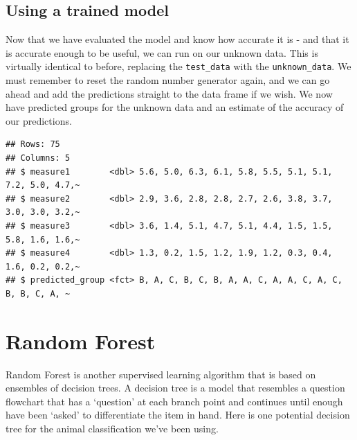 \documentclass[
]{book}
\newenvironment{Shaded}{\begin{snugshade}}{\end{snugshade}}
\newcommand{\DataTypeTok}[1]{\textcolor[rgb]{0.13,0.29,0.53}{#1}}
\newcommand{\DecValTok}[1]{\textcolor[rgb]{0.00,0.00,0.81}{#1}}
\newcommand{\KeywordTok}[1]{\textcolor[rgb]{0.13,0.29,0.53}{\textbf{#1}}}
\newcommand{\NormalTok}[1]{#1}
\newcommand{\OperatorTok}[1]{\textcolor[rgb]{0.81,0.36,0.00}{\textbf{#1}}}
\newcommand{\StringTok}[1]{\textcolor[rgb]{0.31,0.60,0.02}{#1}}
\begin{document}
\hypertarget{using-a-trained-model}{%
\subsection{Using a trained model}\label{using-a-trained-model}}

Now that we have evaluated the model and know how accurate it is - and that it is accurate enough to be useful, we can run on our unknown data. This is virtually identical to before, replacing the \texttt{test\_data} with the \texttt{unknown\_data}. We must remember to reset the random number generator again, and we can go ahead and add the predictions straight to the data frame if we wish. We now have predicted groups for the unknown data and an estimate of the accuracy of our predictions.

\begin{Shaded}
\end{Shaded}

\begin{verbatim}
## Rows: 75
## Columns: 5
## $ measure1        <dbl> 5.6, 5.0, 6.3, 6.1, 5.8, 5.5, 5.1, 5.1, 7.2, 5.0, 4.7,~
## $ measure2        <dbl> 2.9, 3.6, 2.8, 2.8, 2.7, 2.6, 3.8, 3.7, 3.0, 3.0, 3.2,~
## $ measure3        <dbl> 3.6, 1.4, 5.1, 4.7, 5.1, 4.4, 1.5, 1.5, 5.8, 1.6, 1.6,~
## $ measure4        <dbl> 1.3, 0.2, 1.5, 1.2, 1.9, 1.2, 0.3, 0.4, 1.6, 0.2, 0.2,~
## $ predicted_group <fct> B, A, C, B, C, B, A, A, C, A, A, C, A, C, B, B, C, A, ~
\end{verbatim}

\hypertarget{random-forest}{%
\section{Random Forest}\label{random-forest}}

Random Forest is another supervised learning algorithm that is based on ensembles of decision trees. A decision tree is a model that resembles a question flowchart that has a `question' at each branch point and continues until enough have been `asked' to differentiate the item in hand. Here is one potential decision tree for the animal classification we've been using.
\end{document}

